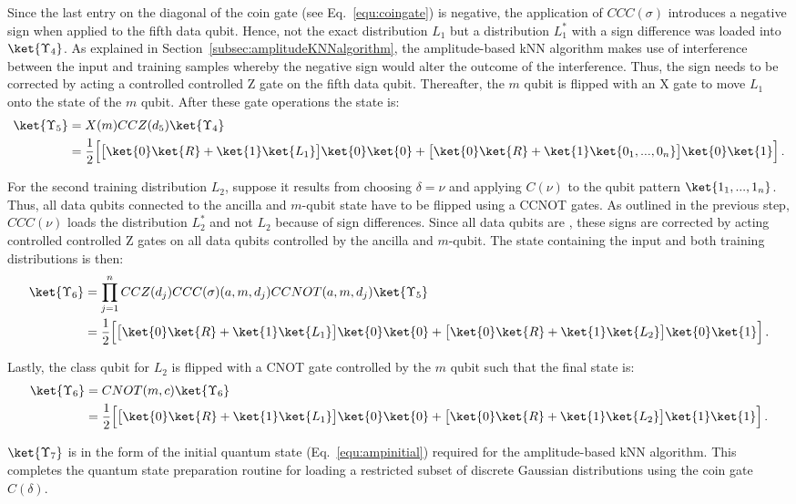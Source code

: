 Since the last entry on the diagonal of the coin gate (see Eq.~\ref{equ:coingate}) is negative, the application of $CCC(\sigma)$ introduces a negative sign when applied to the fifth data qubit. Hence, not the exact distribution $L_1$ but a distribution $L_1^*$ with a sign difference was loaded into $\ket{\Upsilon_4}$. As explained in Section~\ref{subsec:amplitudeKNNalgorithm}, the amplitude-based kNN algorithm makes use of interference between the input and training samples whereby the negative sign would alter the outcome of the interference. Thus, the sign needs to be corrected by acting a controlled controlled Z gate on the fifth data qubit. Thereafter, the $m$ qubit is flipped with an X gate to move $L_1$ onto the \0 state of the $m$ qubit. After these gate operations the state is:
\begin{align}
\ket{\Upsilon_5} &= X(m) CCZ(d_5) \ket{\Upsilon_4}\notag\\
&= \frac{1}{2} \Big[\big[ \ket{0}\ket{R} + \ket{1}\ket{L_1}\big] \ket{0}\ket{0} + \big[\ket{0}\ket{R} + \ket{1}\ket{0_1,...,0_n}\big] \ket{0}\ket{1}\Big]\, .
\end{align}

For the second training distribution $L_2$, suppose it results from choosing $\delta = \nu$ and applying $C(\nu)$ to the qubit pattern $\ket{1_1,...,1_n}$. Thus, all data qubits connected to the \1 ancilla and \1 $m$-qubit state have to be flipped using a CCNOT gates. As outlined in the previous step, $CCC(\nu)$ loads the distribution $L_2^*$ and not $L_2$ because of sign differences. Since all data qubits are \1, these signs are corrected by acting controlled controlled Z gates on all data qubits controlled by the ancilla and $m$-qubit. The state containing the input and both training distributions is then:
\begin{align}
\ket{\Upsilon_6} &= \prod^n_{j=1} CCZ(d_j) CCC(\sigma)(a,m,d_j) CCNOT(a,m,d_j) \ket{\Upsilon_5}\notag\\
&= \frac{1}{2} \Big[\big[ \ket{0}\ket{R} + \ket{1}\ket{L_1}\big] \ket{0}\ket{0} + \big[\ket{0}\ket{R} + \ket{1}\ket{L_2}\big] \ket{0}\ket{1}\Big]\, .
\end{align}

Lastly, the class qubit for $L_2$ is flipped with a CNOT gate controlled by the $m$ qubit such that the final state is:
\begin{align}
\ket{\Upsilon_6} &= CNOT(m,c) \ket{\Upsilon_6}\notag\\
&= \frac{1}{2} \Big[\big[ \ket{0}\ket{R} + \ket{1}\ket{L_1}\big] \ket{0}\ket{0} + \big[\ket{0}\ket{R} + \ket{1}\ket{L_2}\big] \ket{1}\ket{1}\Big]\, .
\end{align}

$\ket{\Upsilon_7}$ is in the form of the initial quantum state (Eq.~\ref{equ:ampinitial}) required for the amplitude-based kNN algorithm. This completes the quantum state preparation routine for loading a restricted subset of discrete Gaussian distributions using the coin gate $C(\delta)$.

